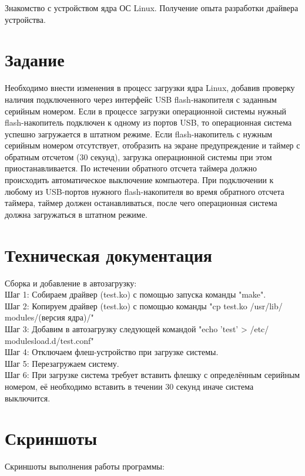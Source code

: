 \documentclass[a4paper]{article}
\begin{document}
Знакомство с устройством ядра ОС Linux. Получение опыта разработки драйвера устройства.

\section{Задание}

Необходимо внести изменения в процесс загрузки ядра Linux, добавив проверку наличия
подключенного через интерфейс USB flash-накопителя с заданным серийным номером.
Если в процессе загрузки операционной системы нужный flash-накопитель подключен к
одному из портов USB, то операционная система успешно загружается в штатном режиме.
Если flash-накопитель с нужным серийным номером отсутствует, отобразить на экране
предупреждение и таймер с обратным отсчетом (30 секунд), загрузка операционной
системы при этом приостанавливается. По истечении обратного отсчета таймера должно
происходить автоматическое выключение компьютера. При подключении к любому из
USB-портов нужного flash-накопителя во время обратного отсчета таймера, таймер должен
останавливаться, после чего операционная система должна загружаться в штатном
режиме.

\section{Техническая документация}


 Сборка и добавление в автозагрузку:\\ 
 Шаг 1: Собираем драйвер (test.ko) с помощью запуска команды "make".\\
 Шаг 2: Копируем драйвер (test.ko) с помощью команды "cp test.ko /usr/lib/ modules/(версия ядра)/"\\
 Шаг 3: Добавим в автозагрузку следующей командой "echo ’test’ > /etc/ modulesload.d/test.conf"\\
 Шаг 4: Отключаем флеш-устройство при загрузке системы.\\
 Шаг 5: Перезагружаем систему.\\
 Шаг 6: При загрузке система требует вставить флешку с определённым серийным номером, её необходимо вставить в течении 30 секунд иначе система выключится.\\
 
\section{Скриншоты}

Скриншоты выполнения работы программы:
\end{document}
